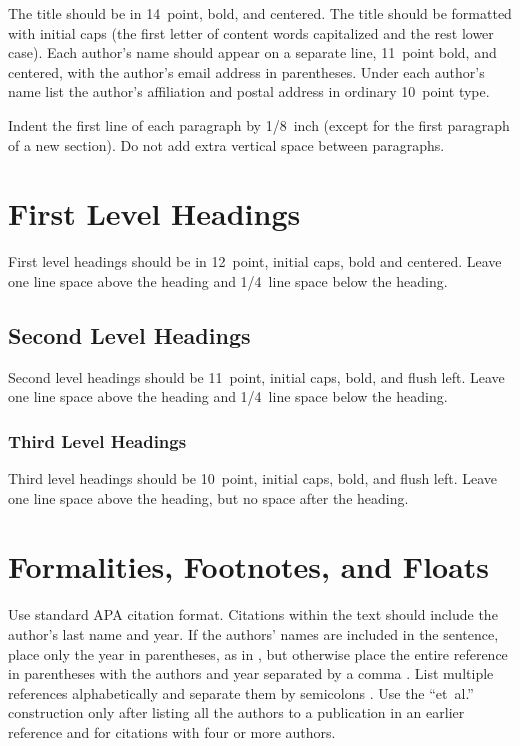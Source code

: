 \documentclass[10pt,letterpaper]{article}
\begin{document}
The title should be in 14~point, bold, and centered. The title should
be formatted with initial caps (the first letter of content words
capitalized and the rest lower case). Each author's name should appear
on a separate line, 11~point bold, and centered, with the author's
email address in parentheses. Under each author's name list the
author's affiliation and postal address in ordinary 10~point type.

Indent the first line of each paragraph by 1/8~inch (except for the
first paragraph of a new section). Do not add extra vertical space
between paragraphs.


\section{First Level Headings}

First level headings should be in 12~point, initial caps, bold and
centered. Leave one line space above the heading and 1/4~line space
below the heading.


\subsection{Second Level Headings}

Second level headings should be 11~point, initial caps, bold, and
flush left. Leave one line space above the heading and 1/4~line
space below the heading.


\subsubsection{Third Level Headings}

Third level headings should be 10~point, initial caps, bold, and flush
left. Leave one line space above the heading, but no space after the
heading.


\section{Formalities, Footnotes, and Floats}

Use standard APA citation format. Citations within the text should
include the author's last name and year. If the authors' names are
included in the sentence, place only the year in parentheses, as in
, but otherwise place the entire reference in
parentheses with the authors and year separated by a comma
\cite{NewellSimon1972a}. List multiple references alphabetically and
separate them by semicolons
\cite{ChalnickBillman1988a,NewellSimon1972a}. Use the
``et~al.'' construction only after listing all the authors to a
publication in an earlier reference and for citations with four or
more authors.
\end{document}
